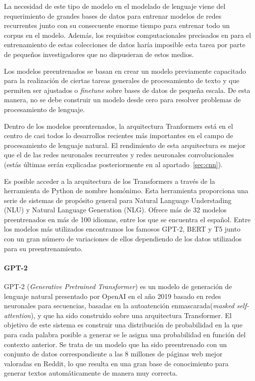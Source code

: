 La necesidad de este tipo de modelo en el modelado de lenguaje viene del requerimiento de grandes bases de datos para entrenar modelos de redes recurrentes junto con su consecuente enorme tiempo para entrenar todo un corpus en el modelo. Además, los requisitos computacionales precisados en para el entrenamiento de estas colecciones de datos haría imposible esta tarea por parte de pequeños investigadores que no dispusieran de estos medios.

Los modelos preentrenados se basan en crear un modelo previamente capacitado para la realización de ciertas tareas generales de procesamiento de texto y que permiten ser ajustados o \textit{finetune} sobre bases de datos de pequeña escala. De esta manera, no se debe construir un modelo desde cero para resolver problemas de procesamiento de lenguaje.

Dentro de los modelos preentrenados, la arquitectura Tranformers está en el centro de casi todos lo desarrollos recientes más importantes en el campo de procesamiento de lenguaje natural. El rendimiento de esta arquitectura es mejor que el de las redes neuronales recurrentes y redes neuronales convolucionales (estás últimas serán explicadas posteriormente en al apartado~\ref{sec:cnn}).

Es posible acceder a la arquitectura de los Transformers a través de la herramienta de Python de nombre homónimo.
Esta herramienta proporciona una serie de sistemas de propósito general para Natural Language Understading (NLU) y Natural Language Generation (NLG). Ofrece más de 32 modelos preentrenados en más de 100 idiomas, entre los que se encuentra el español. Entre los modelos más utilizados encontramos los famosos GPT-2, BERT y T5 junto con un gran número de variaciones de ellos dependiendo de los datos utilizados para su preentrenamiento.


\paragraph{GPT-2}\hfill

GPT-2 (\textit{Generative Pretrained Transformer}) es un modelo de generación de lenguaje natural presentado por OpenAI en el año 2019 basado en redes neuronales para secuencias, basadas en la autoatención%
 enmascarada(\textit{masked self-attention}), y que ha sido construido sobre una arquitectura Transformer. El objetivo de este sistema es construir una distribución de probabilidad en la que para cada palabra posible a generar se le asigna una probabilidad en función del contexto anterior. Se trata de un modelo que ha sido preentrenado con un conjunto de datos correspondiente a las 8 millones de páginas web mejor valoradas en Reddit, lo que resulta en una gran base de conocimiento para generar textos automáticamente de manera muy correcta.


